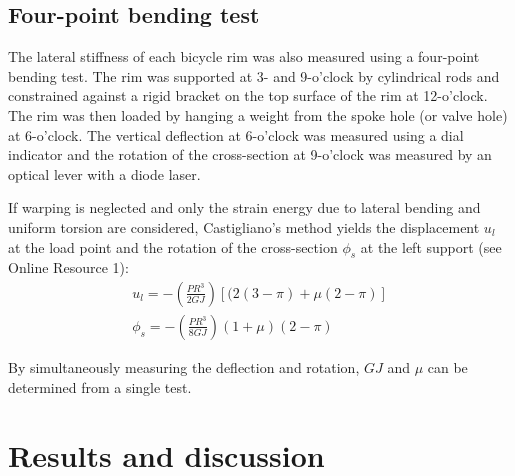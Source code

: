 \documentclass[../thesis.tex]{subfiles}
\begin{document}

\subsection{Four-point bending test}

The lateral stiffness of each bicycle rim was also measured using a four-point bending test. The rim was supported at 3- and 9-o'clock by cylindrical rods and constrained against a rigid bracket on the top surface of the rim at 12-o'clock. The rim was then loaded by hanging a weight from the spoke hole (or valve hole) at 6-o'clock. The vertical deflection at 6-o'clock was measured using a dial indicator and the rotation of the cross-section at 9-o'clock was measured by an optical lever with a diode laser.


If warping is neglected and only the strain energy due to lateral bending and uniform torsion are considered, Castigliano's method yields the displacement $u_l$ at the load point and the rotation of the cross-section $\phi_s$ at the left support (see Online Resource 1):
  \begin{equation}\label{eq:u_4p}
  \begin{array}{c}
  u_l = -\left(\frac{PR^3}{2GJ}\right) [(2(3-\pi)+\mu(2-\pi)]\\
  \phi_s = -\left(\frac{PR^3}{8GJ}\right) (1+\mu)(2-\pi)
  \end{array}
  \end{equation}

By simultaneously measuring the deflection and rotation, $GJ$ and $\mu$ can be determined from a single test.

\section{Results and discussion}
\end{document}
